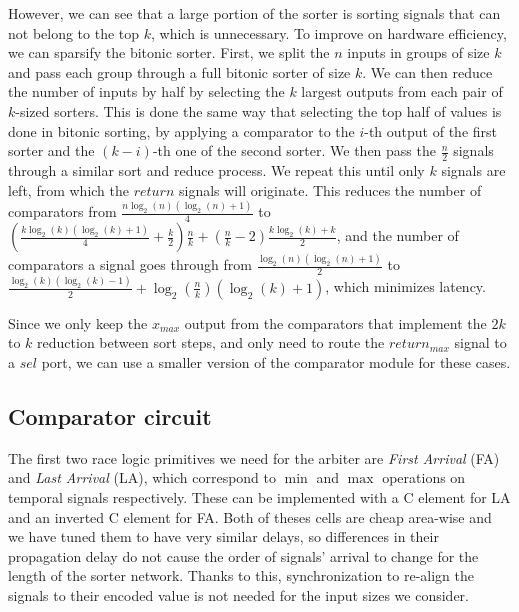 \documentclass{article}
\begin{document}
However, we can see that a large portion of the sorter is
sorting signals that can not belong to the top $k$, which is
unnecessary. To improve on hardware efficiency, we can
sparsify the bitonic sorter. First, we split the $n$ inputs
in groups of size $k$ and pass each group through a full
bitonic sorter of size $k$.
We can then reduce the number of inputs by half by
selecting the $k$ largest outputs from each pair of
$k$-sized sorters. This is done the same way that selecting
the top half of values is done in bitonic sorting, by
applying a comparator to the $i$-th output of the first
sorter and the $(k-i)$-th one of the second sorter. We then
pass the $\frac{n}{2}$ signals through a similar sort and
reduce process. We repeat this until only $k$ signals are
left, from which the $return$ signals will originate. This
reduces the number of comparators from $\frac{n \log_2(n)
(\log_2(n)+1)}{4}$ to $(\frac{k \log_2(k) (\log_2(k)+1)}{4}
+\frac{k}{2}) \frac{n}{k}+(\frac{n}{k}-2)\frac{k \log_2(k) +
k}{2}$, and the number of comparators a signal goes through
from $\frac{\log_2(n) (\log_2(n)+1)}{2}$ to $\frac{\log_2(k)
(\log_2(k)-1)}{2} + \log_2(\frac{n}{k})(\log_2(k) + 1)$,
which minimizes latency.

Since we only keep the $x_{max}$ output from the comparators
that implement the $2k$ to $k$ reduction between sort steps,
and only need to route the $return_{max}$ signal to a $sel$
port, we can use a smaller version of the comparator module
for these cases.

\subsection{Comparator circuit}

The first two race logic primitives we need for the arbiter
are \textit{First Arrival} (FA) and \textit{Last Arrival}
(LA), which correspond to $\min$ and $\max$ operations on
temporal signals respectively. These can be implemented with
a C element for LA and an inverted C element for FA. Both of
theses cells are cheap area-wise and we have tuned them to
have very similar delays, so differences in their
propagation delay do not cause the order of signals' arrival
to change for the length of the sorter network. Thanks to
this, synchronization to re-align the signals to their
encoded value is not needed for the input sizes we consider.
\end{document}
